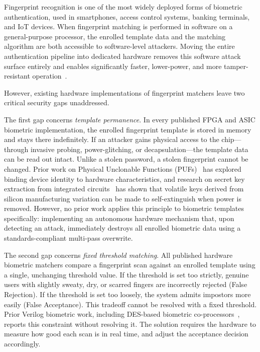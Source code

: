 \documentclass[conference]{IEEEtran}
\begin{document}
Fingerprint recognition is one of the most widely deployed forms of
biometric authentication, used in smartphones, access control systems,
banking terminals, and IoT devices. When fingerprint matching is
performed in software on a general-purpose processor, the enrolled
template data and the matching algorithm are both accessible to
software-level attackers. Moving the entire authentication pipeline
into dedicated hardware removes this software attack surface entirely
and enables significantly faster, lower-power, and more tamper-resistant
operation~\cite{verilog_biometric}.

However, existing hardware implementations of fingerprint matchers
leave two critical security gaps unaddressed.

The first gap concerns \textit{template permanence}. In every published
FPGA and ASIC biometric implementation, the enrolled fingerprint
template is stored in memory and stays there indefinitely. If an
attacker gains physical access to the chip---through invasive probing,
power-glitching, or decapsulation---the template data can be read out
intact. Unlike a stolen password, a stolen fingerprint cannot be
changed. Prior work on Physical Unclonable Functions
(PUFs)~\cite{puf_auth} has explored binding device identity to
hardware characteristics, and research on secret key extraction from
integrated circuits~\cite{secret_key_ic} has shown that volatile keys
derived from silicon manufacturing variation can be made to
self-extinguish when power is removed. However, no prior work applies
this principle to biometric templates specifically: implementing an
autonomous hardware mechanism that, upon detecting an attack,
immediately destroys all enrolled biometric data using a
standards-compliant multi-pass overwrite.

The second gap concerns \textit{fixed threshold matching}. All
published hardware biometric matchers compare a fingerprint scan
against an enrolled template using a single, unchanging threshold
value. If the threshold is set too strictly, genuine users with
slightly sweaty, dry, or scarred fingers are incorrectly rejected
(False Rejection). If the threshold is set too loosely, the system
admits impostors more easily (False Acceptance). This tradeoff cannot
be resolved with a fixed threshold. Prior Verilog biometric work,
including DES-based biometric co-processors~\cite{verilog_biometric},
reports this constraint without resolving it. The solution requires
the hardware to measure how good each scan is in real time, and adjust
the acceptance decision accordingly.
\end{document}
